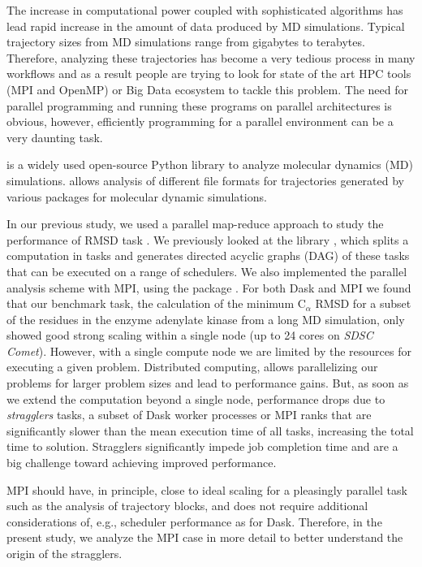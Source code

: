 \label{sec:introduction}
The increase in computational power coupled with sophisticated algorithms has lead rapid increase in the amount of data produced by MD simulations. 
Typical trajectory sizes from MD simulations range from gigabytes to terabytes. 
Therefore, analyzing these trajectories has become a very tedious process in many workflows and as a result people are trying to look for state of the art HPC tools (MPI and OpenMP) or Big Data ecosystem to tackle this problem.
The need for parallel programming and running these programs on parallel architectures is obvious, however, efficiently programming for a parallel environment can be a very daunting task. 

 \citep{Gowers:2016aa,Michaud-Agrawal:2011fu} is a widely used open-source Python library to analyze molecular dynamics (MD) simulations. 
 allows analysis of different file formats for trajectories generated by various packages for molecular dynamic simulations. 

In our previous study, we used a parallel map-reduce approach to study the performance of RMSD task \cite{Khoshlessan:2017ab}. 
We previously looked at the  library \cite{Rocklin:2015aa}, which splits a computation in tasks and generates directed acyclic graphs (DAG) of these tasks that can be executed on a range of schedulers. 
We also implemented the parallel analysis scheme with MPI, using the  package \cite{Dalcin:2011aa, Dalcin:2005aa}. 
For both Dask and MPI we found that our benchmark task, the calculation of the minimum C$_{\alpha}$ RMSD for a
subset of the residues in the enzyme adenylate kinase from a long MD simulation, only showed good strong scaling within a single node (up
to 24 cores on \emph{SDSC Comet}).
However, with a single compute node we are limited by the resources for executing a given problem.
Distributed computing, allows parallelizing our problems for larger problem sizes and lead to performance gains.
But, as soon as we extend the computation beyond a single node, performance drops due to \emph{stragglers} tasks, a subset of Dask worker processes or MPI ranks that are significantly slower than the mean execution time of all tasks, increasing the total time to solution.
Stragglers significantly impede job completion time and are a big challenge toward achieving improved performance.

MPI should have, in principle, close to ideal scaling for a pleasingly parallel task such as the analysis of trajectory blocks, and does not require additional considerations of, e.g., scheduler performance as for Dask. 
Therefore, in the present study, we analyze the MPI case in more detail to better understand the origin of the stragglers.

